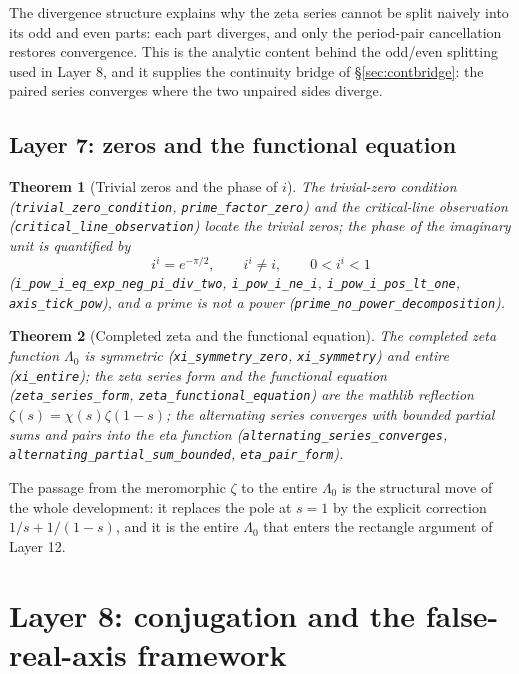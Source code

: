 \documentclass{article}
\newtheorem{theorem}{Theorem}[section]
\newcommand{\zt}{\zeta}
\newcommand{\Lam}{\Lambda}
\newcommand{\Xchi}{\chi}
\begin{document}
The divergence structure explains why the zeta series cannot be split
naively into its odd and even parts: each part diverges, and only the
period-pair cancellation restores convergence. This is the analytic content
behind the odd/even splitting used in Layer 8, and it supplies the
continuity bridge of \S\ref{sec:contbridge}: the paired series converges
where the two unpaired sides diverge.

\subsection{Layer 7: zeros and the functional equation}
\label{sec:L7}

\begin{theorem}[Trivial zeros and the phase of $i$]
\label{thm:trivial}
The trivial-zero condition (\texttt{trivial\_zero\_condition},
\texttt{prime\_factor\_zero}) and the critical-line observation
(\texttt{critical\_line\_observation}) locate the trivial zeros; the phase
of the imaginary unit is quantified by
\[
i^i=e^{-\pi/2},\qquad i^i\neq i,\qquad 0<i^i<1
\]
(\texttt{i\_pow\_i\_eq\_exp\_neg\_pi\_div\_two}, \texttt{i\_pow\_i\_ne\_i},
\texttt{i\_pow\_i\_pos\_lt\_one}, \texttt{axis\_tick\_pow}), and a prime is
not a power (\texttt{prime\_no\_power\_decomposition}).
\end{theorem}

\begin{theorem}[Completed zeta and the functional equation]
\label{thm:xi}
The completed zeta function $\Lam_0$ is symmetric
(\texttt{xi\_symmetry\_zero}, \texttt{xi\_symmetry}) and entire
(\texttt{xi\_entire}); the zeta series form and the functional equation
(\texttt{zeta\_series\_form}, \texttt{zeta\_functional\_equation}) are the
mathlib reflection $\zt(s)=\Xchi(s)\zt(1-s)$; the alternating series
converges with bounded partial sums and pairs into the eta function
(\texttt{alternating\_series\_converges},
\texttt{alternating\_partial\_sum\_bounded}, \texttt{eta\_pair\_form}).
\end{theorem}

The passage from the meromorphic $\zt$ to the entire $\Lam_0$ is the
structural move of the whole development: it replaces the pole at $s=1$ by
the explicit correction $1/s+1/(1-s)$, and it is the entire $\Lam_0$ that
enters the rectangle argument of Layer 12.

\section{Layer 8: conjugation and the false-real-axis framework}
\label{sec:L8}
\end{document}
